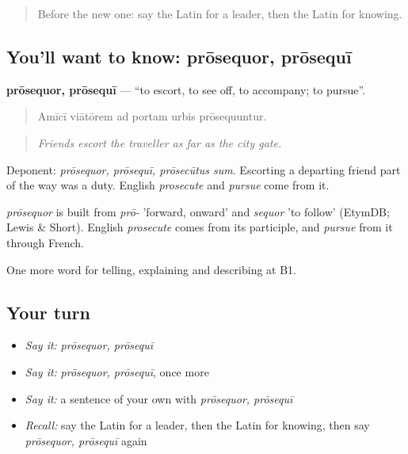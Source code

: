 \label{lesson:LA-C453-prosequor}



\begin{quote}
Before the new one: say the Latin for a leader, then the Latin for knowing.
\end{quote}

\subsection*{You'll want to know: prōsequor, prōsequī}
\textbf{prōsequor, prōsequī} — \textquotedblleft{}to escort, to see off, to accompany; to pursue\textquotedblright{}.

\begin{quote}
Amīcī viātōrem ad portam urbis prōsequuntur.
\end{quote}

\begin{quote}
\emph{Friends escort the traveller as far as the city gate.}
\end{quote}

Deponent: \emph{prōsequor, prōsequī, prōsecūtus sum}. Escorting a departing friend part of the way was a duty. English \emph{prosecute} and \emph{pursue} come from it.

\begin{cousinweb}
\emph{prōsequor} is built from \emph{prō-} 'forward, onward' and \emph{sequor} 'to follow' (EtymDB; Lewis \& Short). English \emph{prosecute} comes from its participle, and \emph{pursue} from it through French.
\end{cousinweb}

\begin{grammarlens}[title={What you've built}]
One more word for telling, explaining and describing at B1.
\end{grammarlens}

\subsection*{Your turn}
\begin{itemize}
\raggedright
  \item \emph{Say it:} \emph{prōsequor, prōsequī}
  \item \emph{Say it:} \emph{prōsequor, prōsequī}, once more
  \item \emph{Say it:} a sentence of your own with \emph{prōsequor, prōsequī}
  \item \emph{Recall:} say the Latin for a leader, then the Latin for knowing, then say \emph{prōsequor, prōsequī} again
\end{itemize}

